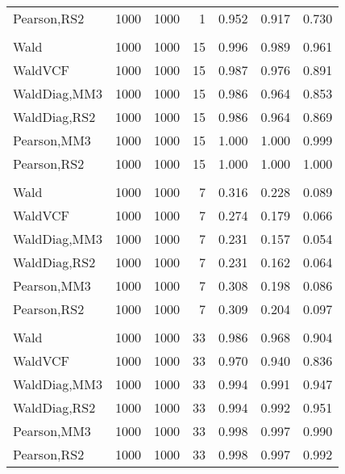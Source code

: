 \documentclass[
]{article}
\begin{document}
\begin{table}[H]
{\begin{tabular}[t]{lrrrrrr}
\hspace{1em}Pearson,RS2 & 1000 & 1000 & 1 & 0.952 & 0.917 & 0.730\\
\addlinespace[0.3em]
\multicolumn{7}{l}{\textbf{1F 15V}}\\
\hspace{1em}Wald & 1000 & 1000 & 15 & 0.996 & 0.989 & 0.961\\
\hspace{1em}WaldVCF & 1000 & 1000 & 15 & 0.987 & 0.976 & 0.891\\
\hspace{1em}WaldDiag,MM3 & 1000 & 1000 & 15 & 0.986 & 0.964 & 0.853\\
\hspace{1em}WaldDiag,RS2 & 1000 & 1000 & 15 & 0.986 & 0.964 & 0.869\\
\hspace{1em}Pearson,MM3 & 1000 & 1000 & 15 & 1.000 & 1.000 & 0.999\\
\hspace{1em}Pearson,RS2 & 1000 & 1000 & 15 & 1.000 & 1.000 & 1.000\\
\addlinespace[0.3em]
\multicolumn{7}{l}{\textbf{2F 10V}}\\
\hspace{1em}Wald & 1000 & 1000 & 7 & 0.316 & 0.228 & 0.089\\
\hspace{1em}WaldVCF & 1000 & 1000 & 7 & 0.274 & 0.179 & 0.066\\
\hspace{1em}WaldDiag,MM3 & 1000 & 1000 & 7 & 0.231 & 0.157 & 0.054\\
\hspace{1em}WaldDiag,RS2 & 1000 & 1000 & 7 & 0.231 & 0.162 & 0.064\\
\hspace{1em}Pearson,MM3 & 1000 & 1000 & 7 & 0.308 & 0.198 & 0.086\\
\hspace{1em}Pearson,RS2 & 1000 & 1000 & 7 & 0.309 & 0.204 & 0.097\\
\addlinespace[0.3em]
\multicolumn{7}{l}{\textbf{3F 15V}}\\
\hspace{1em}Wald & 1000 & 1000 & 33 & 0.986 & 0.968 & 0.904\\
\hspace{1em}WaldVCF & 1000 & 1000 & 33 & 0.970 & 0.940 & 0.836\\
\hspace{1em}WaldDiag,MM3 & 1000 & 1000 & 33 & 0.994 & 0.991 & 0.947\\
\hspace{1em}WaldDiag,RS2 & 1000 & 1000 & 33 & 0.994 & 0.992 & 0.951\\
\hspace{1em}Pearson,MM3 & 1000 & 1000 & 33 & 0.998 & 0.997 & 0.990\\
\hspace{1em}Pearson,RS2 & 1000 & 1000 & 33 & 0.998 & 0.997 & 0.992\\
\bottomrule
\end{tabular}}
\endgroup{}
\end{table}
\end{document}
